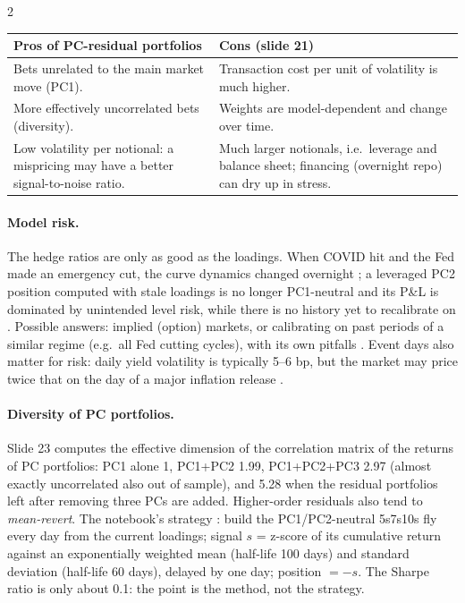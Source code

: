 \begin{paracol}{2}
\begin{center}\small
\begin{tabularx}{\linewidth}{@{}X X@{}}
\toprule
\textbf{Pros of PC-residual portfolios} & \textbf{Cons} (slide 21)\\
\midrule
Bets unrelated to the main market move (PC1). & Transaction cost per unit of volatility is much higher.\\
More effectively uncorrelated bets (diversity). & Weights are model-dependent and change over time.\\
Low volatility per notional: a mispricing may have a better signal-to-noise ratio. &
Much larger notionals, i.e.\ leverage and balance sheet; financing (overnight repo) can dry up in stress.\\
\bottomrule
\end{tabularx}
\end{center}

\paragraph{Model risk.} The hedge ratios are only as good as the loadings. When COVID hit and the Fed made an
emergency cut, the curve dynamics changed overnight ; a leveraged PC2 position computed with
stale loadings is no longer PC1-neutral and its P\&L is dominated by unintended level risk, while there is no
history yet to recalibrate on . Possible answers: implied (option) markets, or calibrating
on past periods of a similar regime (e.g.\ all Fed cutting cycles), with its own pitfalls .
Event days also matter for risk: daily yield volatility is typically 5--6 bp, but the market may price twice
that on the day of a major inflation release .

\paragraph{Diversity of PC portfolios.} Slide 23 computes the effective dimension of the correlation matrix of
the returns of PC portfolios: PC1 alone 1, PC1+PC2 1.99, PC1+PC2+PC3 2.97 (almost exactly uncorrelated also
out of sample), and 5.28 when the residual portfolios left after removing three PCs are added. Higher-order
residuals also tend to \emph{mean-revert}. The notebook's strategy : build the PC1/PC2-neutral
5s7s10s fly every day from the current loadings; signal $s$ = z-score of its cumulative return against an
exponentially weighted mean (half-life 100 days) and standard deviation (half-life 60 days), delayed by one day;
position $=-s$. The Sharpe ratio is only about 0.1: the point is the method, not the strategy.


\end{paracol}

